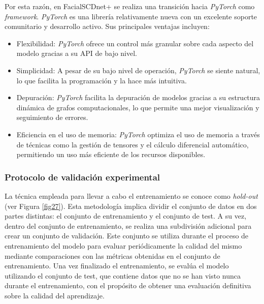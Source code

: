 Por esta razón, en FacialSCDnet+ se realiza una transición hacia \textit{PyTorch} como \textit{framework}. \textit{PyTorch} es una librería relativamente nueva con un excelente soporte comunitario y desarrollo activo. Sus principales ventajas incluyen:

\begin{itemize}
	\item Flexibilidad: \textit{PyTorch} ofrece un control más granular sobre cada aspecto del modelo gracias a su API de bajo nivel.
	\item Simplicidad: A pesar de su bajo nivel de operación, \textit{PyTorch} se siente natural, lo que facilita la programación y la hace más intuitiva.
	\item Depuración: \textit{PyTorch} facilita la depuración de modelos gracias a su estructura dinámica de grafos computacionales, lo que permite una mejor visualización y seguimiento de errores.
	\item Eficiencia en el uso de memoria: \textit{PyTorch} optimiza el uso de memoria a través de técnicas como la gestión de tensores y el cálculo diferencial automático, permitiendo un uso más eficiente de los recursos disponibles.
\end{itemize}


\subsubsection{Protocolo de validación experimental}

La técnica empleada para llevar a cabo el entrenamiento se conoce como \textit{hold-out} (ver Figura \ref{fig27}). Esta metodología implica dividir el conjunto de datos en dos partes distintas: el conjunto de entrenamiento y el conjunto de test. A su vez, dentro del conjunto de entrenamiento, se realiza una subdivisión adicional para crear un conjunto de validación. Este conjunto se utiliza durante el proceso de entrenamiento del modelo para evaluar periódicamente la calidad del mismo mediante comparaciones con las métricas obtenidas en el conjunto de entrenamiento. Una vez finalizado el entrenamiento, se evalúa el modelo utilizando el conjunto de test, que contiene datos que no se han visto nunca durante el entrenamiento, con el propósito de obtener una evaluación definitiva sobre la calidad del aprendizaje.

